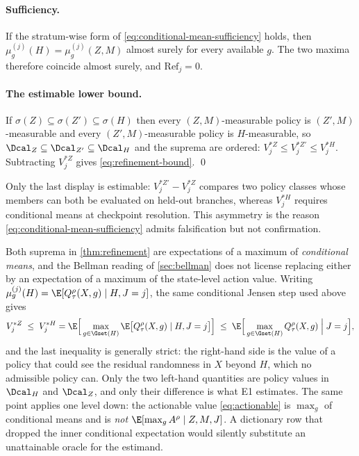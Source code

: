 \paragraph{Sufficiency.}
If the stratum-wise form of \eqref{eq:conditional-mean-sufficiency} holds, then
$\mu^{(j)}_g(H)=\mu^{(j)}_g(Z,M)$ almost surely for every available $g$.  The
two maxima therefore coincide almost surely, and $\mathrm{Ref}_j=0$.

\paragraph{The estimable lower bound.}
If $\sigma(Z)\subseteq\sigma(Z')\subseteq\sigma(H)$ then every $(Z,M)$-measurable
policy is $(Z',M)$-measurable and every $(Z',M)$-measurable policy is
$H$-measurable, so $\Dcal_Z\subseteq\Dcal_{Z'}\subseteq\Dcal_H$ and the suprema
are ordered: $V^{*Z}_j\le V^{*Z'}_j\le V^{*H}_j$.  Subtracting $V^{*Z}_j$ gives
\eqref{eq:refinement-bound}. \qed

\medskip
Only the last display is estimable: $V^{*Z'}_j-V^{*Z}_j$ compares two policy
classes whose members can both be evaluated on held-out branches, whereas
$V^{*H}_j$ requires conditional means at checkpoint resolution.  This asymmetry
is the reason \eqref{eq:conditional-mean-sufficiency} admits falsification but
not confirmation.

\begin{remark}
\label{rem:aggregation}
Both suprema in \cref{thm:refinement} are expectations of a maximum of
\emph{conditional means}, and the Bellman reading of \cref{sec:bellman} does not
license replacing either by an expectation of a maximum of the state-level
action value.  Writing $\mu^{(j)}_g(H)=\E[Q^\rho_\tau(X,g)\mid H,J=j]$, the same
conditional Jensen step used above gives
\begin{equation}
 V^{*Z}_j\;\le\;V^{*H}_j
 =\E\Big[\max_{g\in\Gset(H)}\E\big[Q^\rho_\tau(X,g)\mid H,J=j\big]\Big]
 \;\le\;\E\Big[\max_{g\in\Gset(H)}Q^\rho_\tau(X,g)\;\Big|\;J=j\Big],
 \label{eq:aggregation-chain}
\end{equation}
and the last inequality is generally strict: the right-hand side is the value of
a policy that could see the residual randomness in $X$ beyond $H$, which no
admissible policy can.  Only the two left-hand quantities are policy values in
$\Dcal_H$ and $\Dcal_Z$, and only their difference is what E1 estimates.  The
same point applies one level down: the actionable value \eqref{eq:actionable} is
$\max_g$ of conditional means and is \emph{not} $\E[\max_g A^\rho\mid Z,M,J]$.
A dictionary row that dropped the inner conditional expectation would silently
substitute an unattainable oracle for the estimand.
\end{remark}

